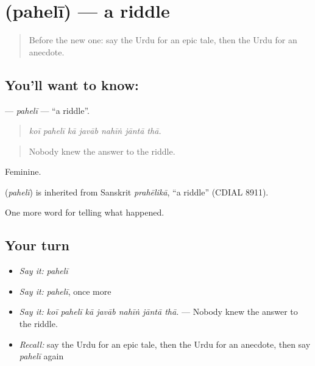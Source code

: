 \section[\texorpdfstring{\ur{پہیلی} (pahelī)}{پہیلی (pahelī)}]{ (pahelī) — a riddle}

\label{lesson:UR-C324-paheli}



\begin{quote}
Before the new one: say the Urdu for an epic tale, then the Urdu for an anecdote.
\end{quote}

\subsection*{You'll want to know: }
\textbf{} — \emph{pahelī} — \textquotedblleft{}a riddle\textquotedblright{}.

\begin{quote}
      
\end{quote}

\begin{quote}
\emph{koī pahelī kā javāb nahīṅ jāntā thā.}
\end{quote}

\begin{quote}
Nobody knew the answer to the riddle.
\end{quote}

Feminine.

\begin{cousinweb}
\textbf{} (\emph{pahelī}) is inherited from Sanskrit \emph{prahēlikā}, \textquotedblleft{}a riddle\textquotedblright{} (CDIAL 8911).
\end{cousinweb}

\begin{grammarlens}[title={What you've built}]
One more word for telling what happened.
\end{grammarlens}

\subsection*{Your turn}
\begin{itemize}
\raggedright
  \item \emph{Say it:} \emph{pahelī}
  \item \emph{Say it:} \emph{pahelī}, once more
  \item \emph{Say it:} \emph{koī pahelī kā javāb nahīṅ jāntā thā.} — Nobody knew the answer to the riddle.
  \item \emph{Recall:} say the Urdu for an epic tale, then the Urdu for an anecdote, then say \emph{pahelī} again
\end{itemize}

